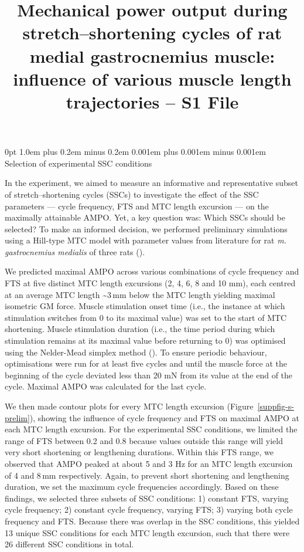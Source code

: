 \documentclass[
  11pt,
  a4paper]{article}
\title{Mechanical power output during stretch--shortening cycles of rat
medial gastrocnemius muscle: influence of various muscle length
trajectories -- S1 File}
\author{}
\date{}
\makeatletter
\renewcommand{\section}{%
  \@startsection{section}{1}
    {0pt} 					%
    {1.0em plus 0.2em minus 0.2em} 	%
    {0.001em plus 0.001em minus 0.001em}    	%
    {\Large\bfseries\sffamily}%
}
\newcommand*\quartosuppfigref[1]{Figure \hyperref[#1]{S\ref{#1}}}
\makeatother
\begin{document}
\linenumbers

\renewcommand{\thesection}{S\arabic{section}}
\setcounter{section}{0}
\renewcommand{\thesuppfig}{\thesection.\arabic{suppfig}}
\renewcommand*\quartosuppfigref[1]{Figure~\ref{#1}}


\section{Selection of experimental SSC
conditions}\label{selection-of-experimental-ssc-conditions}

In the experiment, we aimed to measure an informative and representative
subset of stretch--shortening cycles (SSCs) to investigate the effect of
the SSC parameters --- cycle frequency, FTS and MTC length excursion ---
on the maximally attainable AMPO. Yet, a key question was: Which SSCs
should be selected? To make an informed decision, we performed
preliminary simulations using a Hill-type MTC model with parameter
values from literature for rat \emph{m. gastrocnemius medialis} of three
rats ().

We predicted maximal AMPO across various combinations of cycle frequency
and FTS at five distinct MTC length excursions (2, 4, 6, 8 and 10 mm),
each centred at an average MTC length \textasciitilde3\,mm below the MTC
length yielding maximal isometric GM force. Muscle stimulation onset
time (i.e., the instance at which stimulation switches from 0 to its
maximal value) was set to the start of MTC shortening. Muscle
stimulation duration (i.e., the time period during which stimulation
remains at its maximal value before returning to 0) was optimised using
the Nelder-Mead simplex method (). To ensure periodic behaviour, optimisations were run
for at least five cycles and until the muscle force at the beginning of
the cycle deviated less than 20 mN from its value at the end of the
cycle. Maximal AMPO was calculated for the last cycle.

We then made contour plots for every MTC length excursion
(\quartosuppfigref{suppfig-s-prelim}), showing the influence of cycle
frequency and FTS on maximal AMPO at each MTC length excursion. For the
experimental SSC conditions, we limited the range of FTS between 0.2 and
0.8 because values outside this range will yield very short shortening
or lengthening durations. Within this FTS range, we observed that AMPO
peaked at about 5 and 3 Hz for an MTC length excursion of 4 and 8\,mm
respectively. Again, to prevent short shortening and lengthening
duration, we set the maximum cycle frequencies accordingly. Based on
these findings, we selected three subsets of SSC conditions: 1) constant
FTS, varying cycle frequency; 2) constant cycle frequency, varying FTS;
3) varying both cycle frequency and FTS. Because there was overlap in
the SSC conditions, this yielded 13 unique SSC conditions for each MTC
length excursion, such that there were 26 different SSC conditions in
total.
\end{document}
